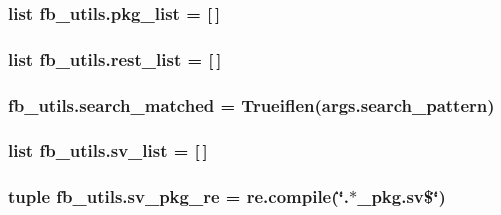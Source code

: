 \hypertarget{namespacefb__utils_a6887692f592843384a67fefe3b9144da}{
\subsubsection[{pkg\-\_\-list}]{\setlength{\rightskip}{0pt plus 5cm}list fb\-\_\-utils.\-pkg\-\_\-list = \mbox{[}$\,$\mbox{]}}}\label{namespacefb__utils_a6887692f592843384a67fefe3b9144da}
\hypertarget{namespacefb__utils_a905045d2b7aefe95f688c8257c04e455}{
\subsubsection[{rest\-\_\-list}]{\setlength{\rightskip}{0pt plus 5cm}list fb\-\_\-utils.\-rest\-\_\-list = \mbox{[}$\,$\mbox{]}}}\label{namespacefb__utils_a905045d2b7aefe95f688c8257c04e455}
\hypertarget{namespacefb__utils_a1f39868616143f0b1afc09fa31f902a8}{
\subsubsection[{search\-\_\-matched}]{\setlength{\rightskip}{0pt plus 5cm}fb\-\_\-utils.\-search\-\_\-matched = Trueiflen(args.\-search\-\_\-pattern)}}\label{namespacefb__utils_a1f39868616143f0b1afc09fa31f902a8}
\hypertarget{namespacefb__utils_ac57a5d2600819a0cd95a751784e809c9}{
\subsubsection[{sv\-\_\-list}]{\setlength{\rightskip}{0pt plus 5cm}list fb\-\_\-utils.\-sv\-\_\-list = \mbox{[}$\,$\mbox{]}}}\label{namespacefb__utils_ac57a5d2600819a0cd95a751784e809c9}
\hypertarget{namespacefb__utils_a9a64b83b1f280ce221da461c3a1e3f69}{
\subsubsection[{sv\-\_\-pkg\-\_\-re}]{\setlength{\rightskip}{0pt plus 5cm}tuple fb\-\_\-utils.\-sv\-\_\-pkg\-\_\-re = re.\-compile(\char`\"{}.$\ast$\-\_\-pkg.\-sv\$\char`\"{})}}\label{namespacefb__utils_a9a64b83b1f280ce221da461c3a1e3f69}
